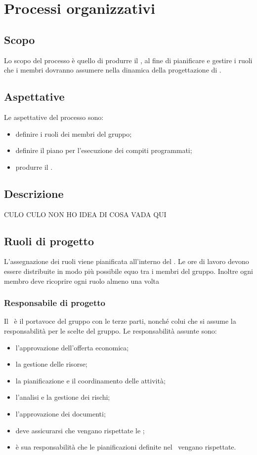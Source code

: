 \documentclass[../NormeDiProgetto.tex]{subfiles}
\begin{document}
	\section{Processi organizzativi}
		\subsection{Scopo}
			Lo scopo del processo è quello di produrre il \pianodiprogettoRR, al fine di pianificare e gestire i ruoli che i membri dovranno assumere nella dinamica della progettazione di \progetto.
		\subsection{Aspettative}
			Le aspettative del processo sono:
			\begin{itemize}
				\item definire i ruoli dei membri del gruppo;
				\item definire il piano per l'esecuzione dei compiti programmati;
				\item produrre il \pianodiprogetto.
			\end{itemize}				
		\subsection{Descrizione}
			CULO CULO NON HO IDEA DI COSA VADA QUI
		\subsection{Ruoli di progetto}
			L'assegnazione dei ruoli viene pianificata all'interno del \pianodiprogetto. Le ore di lavoro devono essere distribuite in modo più possibile equo tra i membri del gruppo. Inoltre ogni membro deve ricoprire ogni ruolo almeno una volta
			\subsubsection{Responsabile di progetto}
				Il \responsabilediprogetto\ è il portavoce del gruppo con le terze parti, nonché colui che si assume la responsabilità per le scelte del gruppo.
				Le responsabilità assunte sono:
				\begin{itemize}
					\item l'approvazione dell'offerta economica;
					\item la gestione delle risorse;
					\item la pianificazione e il coordinamento delle attività;
					\item l'analisi e la gestione dei rischi;	
					\item l'approvazione dei documenti;
					\item deve assicurarsi che vengano rispettate le \normediprogetto;
					\item è sua responsabilità che le pianificazioni definite nel \pianodiprogetto\ vengano rispettate.
				\end{itemize}
\end{document}
